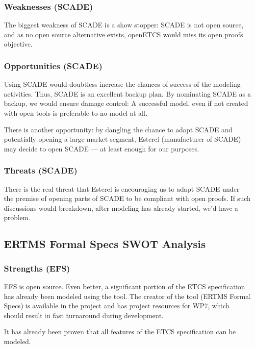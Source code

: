 \subsubsection{Weaknesses (SCADE)}

The biggest weakness of SCADE is a show stopper: SCADE is not open source, and as no open source alternative exists, openETCS would miss its open proofs objective.

\subsubsection{Opportunities (SCADE)}

Using SCADE would doubtless increase the chances of success of the modeling activities.  Thus, SCADE is an excellent backup plan.  By nominating SCADE as a backup, we would ensure damage control: A successful model, even if not created with open tools is preferable to no model at all.

There is another opportunity: by dangling the chance to adapt SCADE and potentially opening a large market segment, Esterel (manufacturer of SCADE) may decide to open SCADE --- at least enough for our purposes.

\subsubsection{Threats (SCADE)}

There is the real threat that Esterel is encouraging us to adapt SCADE under the premise of opening parts of SCADE to be compliant with open proofs.  If such discussions would breakdown, after modeling has already started, we'd have a problem.

\subsection{ERTMS Formal Specs SWOT Analysis}

\subsubsection{Strengths (EFS)}

EFS is open source.  Even better, a significant portion of the ETCS specification has already been modeled using the tool.  The creator of the tool (ERTMS Formal Specs) is available in the project and has project resources for WP7, which should result in fast turnaround during development.

It has already been proven that all features of the ETCS specification can be modeled.

